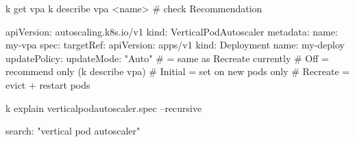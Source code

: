 \begin{cheatcodebash}
k get vpa
k describe vpa <name>  # check Recommendation
\end{cheatcodebash}

\begin{cheatcodebash}
apiVersion: autoscaling.k8s.io/v1
kind: VerticalPodAutoscaler
metadata: {name: my-vpa}
spec:
  targetRef:
    apiVersion: apps/v1
    kind: Deployment
    name: my-deploy
  updatePolicy:
    updateMode: "Auto"  # = same as Recreate currently
               # Off      = recommend only (k describe vpa)
               # Initial  = set on new pods only
               # Recreate = evict + restart pods
\end{cheatcodebash}

\begin{cheatcodebash}
k explain verticalpodautoscaler.spec --recursive
\end{cheatcodebash}

\begin{cheatcodebash}
search: "vertical pod autoscaler"
\end{cheatcodebash}
